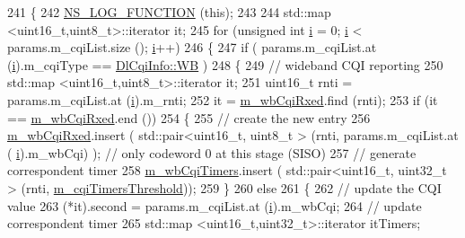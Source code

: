 \begin{DoxyCode}
241 \{
242   \hyperlink{log-macros-disabled_8h_a90b90d5bad1f39cb1b64923ea94c0761}{NS\_LOG\_FUNCTION} (\textcolor{keyword}{this});
243 
244   std::map <uint16\_t,uint8\_t>::iterator it;
245   \textcolor{keywordflow}{for} (\textcolor{keywordtype}{unsigned} \textcolor{keywordtype}{int} \hyperlink{bernuolliDistribution_8m_a6f6ccfcf58b31cb6412107d9d5281426}{i} = 0; \hyperlink{bernuolliDistribution_8m_a6f6ccfcf58b31cb6412107d9d5281426}{i} < params.m\_cqiList.size (); \hyperlink{bernuolliDistribution_8m_a6f6ccfcf58b31cb6412107d9d5281426}{i}++)
246     \{
247       \textcolor{keywordflow}{if} ( params.m\_cqiList.at (\hyperlink{bernuolliDistribution_8m_a6f6ccfcf58b31cb6412107d9d5281426}{i}).m\_cqiType == \hyperlink{structns3_1_1DlCqiInfo_a58a9fff4b49e4a8df1fdea1005c4735caa1097f844b06ac6dbdbac42802ba2403}{DlCqiInfo::WB} )
248         \{
249           \textcolor{comment}{// wideband CQI reporting}
250           std::map <uint16\_t,uint8\_t>::iterator it;
251           uint16\_t rnti = params.m\_cqiList.at (\hyperlink{bernuolliDistribution_8m_a6f6ccfcf58b31cb6412107d9d5281426}{i}).m\_rnti;
252           it = \hyperlink{classns3_1_1MmWaveRrMacScheduler_ab048c846f6d5d71795b65b9f91c6766a}{m\_wbCqiRxed}.find (rnti);
253           \textcolor{keywordflow}{if} (it == \hyperlink{classns3_1_1MmWaveRrMacScheduler_ab048c846f6d5d71795b65b9f91c6766a}{m\_wbCqiRxed}.end ())
254             \{
255               \textcolor{comment}{// create the new entry}
256               \hyperlink{classns3_1_1MmWaveRrMacScheduler_ab048c846f6d5d71795b65b9f91c6766a}{m\_wbCqiRxed}.insert ( std::pair<uint16\_t, uint8\_t > (rnti, params.m\_cqiList.at (
      \hyperlink{bernuolliDistribution_8m_a6f6ccfcf58b31cb6412107d9d5281426}{i}).m\_wbCqi) ); \textcolor{comment}{// only codeword 0 at this stage (SISO)}
257               \textcolor{comment}{// generate correspondent timer}
258               \hyperlink{classns3_1_1MmWaveRrMacScheduler_ae70383b2b2b66701ea96205d5ad60c41}{m\_wbCqiTimers}.insert ( std::pair<uint16\_t, uint32\_t > (rnti, 
      \hyperlink{classns3_1_1MmWaveRrMacScheduler_a21360d09f2e5e4b9fc304752aef8ae6a}{m\_cqiTimersThreshold}));
259             \}
260           \textcolor{keywordflow}{else}
261             \{
262               \textcolor{comment}{// update the CQI value}
263               (*it).second = params.m\_cqiList.at (\hyperlink{bernuolliDistribution_8m_a6f6ccfcf58b31cb6412107d9d5281426}{i}).m\_wbCqi;
264               \textcolor{comment}{// update correspondent timer}
265               std::map <uint16\_t,uint32\_t>::iterator itTimers;

\end{DoxyCode}
